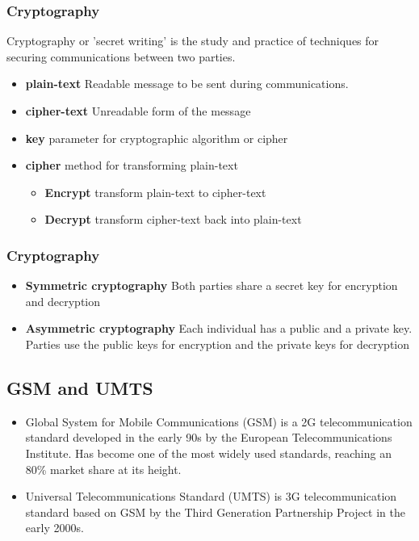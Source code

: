 \documentclass{beamer}
\begin{document}
	\begin{frame}
	\frametitle{Cryptography}
	
		Cryptography or 'secret writing' is the study and practice of techniques for securing communications between two parties. \linebreak
		\begin{itemize}
			\item \textbf{plain-text}  Readable message to be sent during communications.
			\item \textbf{cipher-text} Unreadable form of the message
			\item \textbf{key} parameter for cryptographic algorithm or cipher		
			\item \textbf{cipher} method for transforming plain-text
			\begin{itemize}
				\item \textbf{Encrypt} transform plain-text to cipher-text
				\item \textbf{Decrypt} transform cipher-text back into plain-text
				
				
			\end{itemize}
	        		
			
		\end{itemize}		 
	
	\end{frame}
	\begin{frame}
	\frametitle{Cryptography}
		\begin{itemize}
			\item \textbf{Symmetric cryptography} 
			Both parties share a secret key for encryption and decryption
			\item \textbf{Asymmetric cryptography}
			Each individual has a public and a private key. Parties use the public keys for encryption and the private keys for decryption
		\end{itemize}
	
	\end{frame}

\subsection{GSM and UMTS}
	
		\begin{frame}
		\begin{itemize}
		\item Global System for Mobile Communications (GSM) is a 2G telecommunication standard developed in the early 90s by the European Telecommunications Institute. Has become one of the most widely used standards, reaching an 80\% market share at its height.
					
		
		\item Universal Telecommunications Standard (UMTS) is 3G telecommunication standard based on GSM by the Third Generation Partnership Project in the early 2000s.   
		\end{itemize}
	\end{frame}
\end{document}
